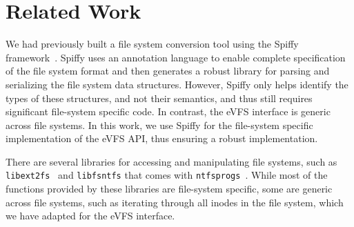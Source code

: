 \vspace{-0.75em}
\section{Related Work\label{sec:Related_Work}}

We had previously built a file system conversion tool using the Spiffy framework~\cite{sun2018spiffy}. Spiffy uses an annotation language to enable complete specification of the file system format and then generates a robust library for parsing and serializing the file system data structures. However, Spiffy only helps identify the types of these structures, and not their semantics, and thus still requires significant file-system specific code. In contrast, the eVFS interface is generic across file systems. In this work, we use Spiffy for the file-system specific implementation of the eVFS API, thus ensuring a robust implementation.


There are several libraries for accessing and manipulating file systems, such as \texttt{libext2fs}~\cite{tso-e2fsprogs} and \texttt{libfsntfs} that comes with \texttt{ntfsprogs}~\cite{mathes2007ntfs}. While most of the functions provided by these libraries are file-system specific, some are generic across file systems, such as iterating through all inodes in the file system, which we have adapted for the eVFS interface.


